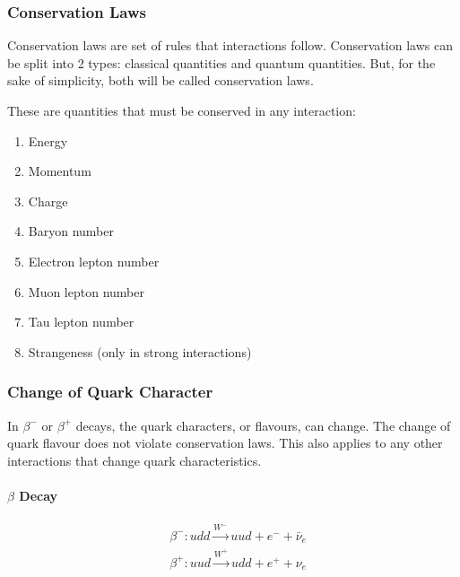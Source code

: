 \documentclass[10pt]{article}
\begin{document}
\begin{multicols}{2}
	\subsubsection{Conservation Laws}
	Conservation laws are set of rules that interactions follow. Conservation laws can be split into 2 types: classical quantities and quantum quantities. But, for the sake of simplicity, both will be called conservation laws.
	\medskip

	These are quantities that must be conserved in any interaction:
	\medskip
	\begin{enumerate}
		\item Energy
		\item Momentum
		\item Charge
		\item Baryon number
		\item Electron lepton number
		\item Muon lepton number
		\item Tau lepton number
		\item Strangeness (only in strong interactions)
	\end{enumerate}

	\subsubsection{Change of Quark Character}
	In $\beta^-$ or $\beta^+$ decays, the quark characters, or flavours, can change.
	The change of quark flavour does not violate conservation laws. This also
	applies to any other interactions that change quark characteristics.

	\paragraph{$\beta$ Decay}
	\begin{align*}
		 & \beta^-: udd \xrightarrow{W^-}uud + e^- + \bar{\nu}_e \\
		 & \beta^+: uud \xrightarrow{W^+} udd + e^+ + \nu_e      \\
	\end{align*}
\end{multicols}
\end{document}
